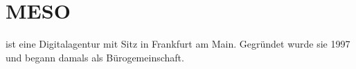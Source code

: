 \section{MESO}
\label{section:meso}

\mesoFull{} ist eine Digitalagentur mit Sitz in Frankfurt am Main.
Gegründet wurde sie 1997 und begann damals als Bürogemeinschaft.